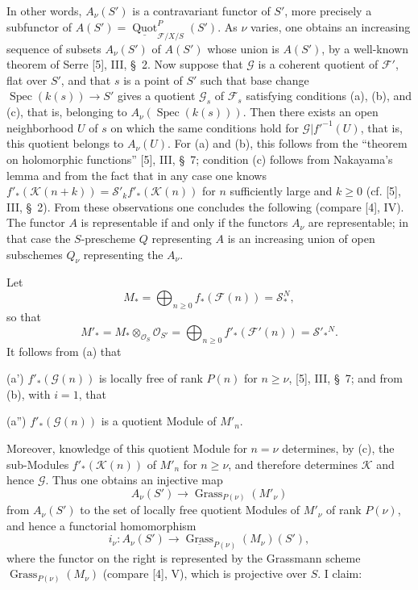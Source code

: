 In other words, $A_\nu(S')$ is a contravariant functor of $S'$, more precisely
a subfunctor of
$A(S')=\underline{\operatorname{Quot}}^P_{\mathcal F/X/S}(S')$. As $\nu$
varies, one obtains an increasing sequence of subsets $A_\nu(S')$ of $A(S')$
whose union is $A(S')$, by a well-known theorem of Serre [5], III, \S~2. Now
suppose that $\mathcal G$ is a coherent quotient of $\mathcal F'$, flat over
$S'$, and that $s$ is a point of $S'$ such that base change
$\operatorname{Spec}(k(s))\longrightarrow S'$ gives a quotient
$\mathcal G_s$ of $\mathcal F_s$ satisfying conditions (a), (b), and (c), that
is, belonging to $A_\nu(\operatorname{Spec}(k(s)))$. Then there exists an open
neighborhood $U$ of $s$ on which the same conditions hold for
$\mathcal G|f'^{-1}(U)$, that is, this quotient belongs to $A_\nu(U)$. For (a)
and (b), this follows from the “theorem on holomorphic functions” [5], III,
\S~7; condition (c) follows from Nakayama's lemma and from the fact that in any
case one knows
$f'_*(\mathcal K(n+k))=\mathcal S'_k f'_*(\mathcal K(n))$
for $n$ sufficiently large and $k\geq0$ (cf. [5], III, \S~2). From these
observations one concludes the following (compare [4], IV). The functor $A$ is
representable if and only if the functors $A_\nu$ are representable; in that
case the $S$-prescheme $Q$ representing $A$ is an increasing union of open
subschemes $Q_\nu$ representing the $A_\nu$.

Let
\[
M_* =\bigoplus_{n\geq0}f_*(\mathcal F(n))=\mathcal S_*^{N},
\]
so that
\[
M'_* =M_*\otimes_{\mathcal O_S}\mathcal O_{S'}
=\bigoplus_{n\geq0}f'_*(\mathcal F'(n))=\mathcal S'_*{}^{N}.
\]
It follows from (a) that

\noindent (a') $f'_*(\mathcal G(n))$ is locally free of rank $P(n)$ for
$n\geq\nu$, [5], III, \S~7; and from (b), with $i=1$, that

\noindent (a'') $f'_*(\mathcal G(n))$ is a quotient Module of $M'_n$.

Moreover, knowledge of this quotient Module for $n=\nu$ determines, by (c),
the sub-Modules $f'_*(\mathcal K(n))$ of $M'_n$ for $n\geq\nu$, and therefore
determines $\mathcal K$ and hence $\mathcal G$. Thus one obtains an injective
map
\[
A_\nu(S')\longrightarrow\operatorname{Grass}_{P(\nu)}(M'_\nu)
\]
from $A_\nu(S')$ to the set of locally free quotient Modules of $M'_\nu$ of
rank $P(\nu)$, and hence a functorial homomorphism
\[
i_\nu:A_\nu(S')\longrightarrow
\underline{\operatorname{Grass}}_{P(\nu)}(M_\nu)(S'),
\]
where the functor on the right is represented by the Grassmann scheme
$\operatorname{Grass}_{P(\nu)}(M_\nu)$ (compare [4], V), which is projective
over $S$. I claim:

